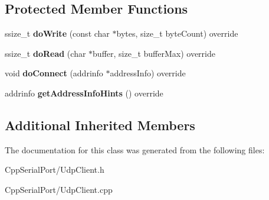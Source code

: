 \subsection*{Protected Member Functions}
\begin{DoxyCompactItemize}
\item 
\mbox{\label{class_cpp_serial_port_1_1_udp_client_ac383e76251afd149db2dd3b26d649bcd}} 
ssize\+\_\+t {\bfseries do\+Write} (const char $\ast$bytes, size\+\_\+t byte\+Count) override
\item 
\mbox{\label{class_cpp_serial_port_1_1_udp_client_ad0952d23227c989886903a5d711ee2c9}} 
ssize\+\_\+t {\bfseries do\+Read} (char $\ast$buffer, size\+\_\+t buffer\+Max) override
\item 
\mbox{\label{class_cpp_serial_port_1_1_udp_client_acf4d84370ebc9e7ca70e77ad79123efa}} 
void {\bfseries do\+Connect} (addrinfo $\ast$address\+Info) override
\item 
\mbox{\label{class_cpp_serial_port_1_1_udp_client_a72269903ffd7d1b3d6c8b487af4ab6ed}} 
addrinfo {\bfseries get\+Address\+Info\+Hints} () override
\end{DoxyCompactItemize}
\subsection*{Additional Inherited Members}


The documentation for this class was generated from the following files\+:\begin{DoxyCompactItemize}
\item 
Cpp\+Serial\+Port/Udp\+Client.\+h\item 
Cpp\+Serial\+Port/Udp\+Client.\+cpp\end{DoxyCompactItemize}
